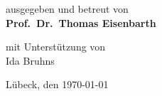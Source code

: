 \begin{titlepage}
{%
\vspace*{1.5em}

ausgegeben und betreut von \\ %
\textbf{Prof.\ Dr.\ Thomas Eisenbarth}

\vspace*{1.5em}

mit Unterstützung von \\ %
Ida Bruhns

\vspace*{2em}

\vfill

Lübeck, den \today
}
\end{titlepage}
